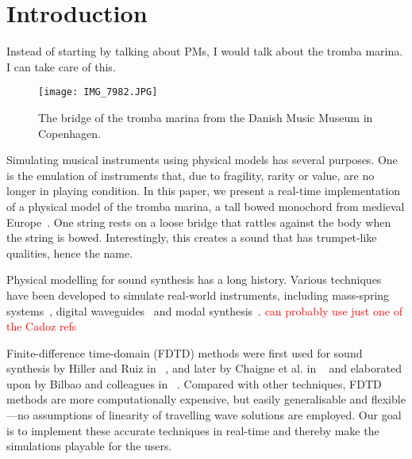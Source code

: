 \documentclass[dvipsnames, pdftex]{article}
\title{\papertitle}
\def\SBcomment[#1]{\textcolor{Red}{#1}}
\def\MDcomment[#1]{\textcolor{Blue}{#1}}
\def\SScomment[#1]{\textcolor{OliveGreen}{#1}}
\begin{document}
%
\capstartfalse
\maketitle
\capstarttrue
%
\begin{abstract}
You can place comments in colour if you want :) Like \SBcomment[this (Stefan)], \MDcomment[this (Michele)] or \SScomment[this (Stefania)].
\end{abstract}
%

\section{Introduction}\label{sec:introduction}
\SScomment[Instead of starting by talking about PMs, I would talk about the tromba marina. I can take care of this.]

 
 
   \begin{figure}
  \centering
  \texttt{[image: IMG\_7982.JPG]}
  \caption{The bridge of the tromba marina from the Danish Music Museum in Copenhagen. }
  \label{fig:bridge}
\end{figure}

Simulating musical instruments using physical models has several purposes. One is the emulation of instruments that, due to fragility, rarity or value, are no longer in playing condition. In this paper, we present a real-time implementation of a physical model of the tromba marina, a tall bowed monochord from medieval Europe~\cite{encyclopaedia2020}. One string rests on a loose bridge that rattles against the body when the string is bowed. Interestingly, this creates a sound that has trumpet-like qualities, hence the name. 

Physical modelling for sound synthesis has a long history. Various techniques have been developed to simulate real-world instruments, including mass-spring systems~\cite{cadoz79, cadoz83, cadoz1993cordis}, digital waveguides~\cite{smith1992physical} and modal synthesis~\cite{morrison1993mosaic}. 
\SBcomment[can probably use just one of the Cadoz refs]

Finite-difference time-domain (FDTD) methods were first used for sound synthesis by Hiller and Ruiz in ~\cite{Ruiz1969, Hiller1971, Hiller2}, and later by Chaigne et al. in ~\cite{Chaigne92, Chaigne} and elaborated upon by Bilbao and colleagues in ~\cite{bilbao2009numerical, Bilbao2018:Tutorial}. Compared with other techniques, FDTD methods are more computationally expensive, but easily generalisable and flexible---no assumptions of linearity of travelling wave solutions are employed. Our goal is to implement these accurate techniques in real-time and thereby make the simulations playable for the users. 
\end{document}
